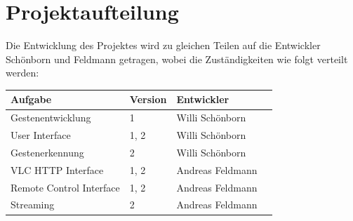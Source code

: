 \documentclass[a4paper,12pt]{article}
\begin{document}
\section*{Projektaufteilung}
Die Entwicklung des Projektes wird zu gleichen Teilen auf die Entwickler Schönborn und Feldmann getragen, wobei die Zuständigkeiten wie folgt verteilt werden:

\begin{table}[h!b!p!]
\begin{tabular*}{\textwidth}{ l l l l }
	\toprule
	\textbf{Aufgabe} & \textbf{Version} & \textbf{Entwickler} \\
	\midrule
	Gestenentwicklung & 1 & Willi Schönborn  \\ 
	User Interface & 1, 2 & Willi Schönborn \\
	Gestenerkennung & 2 & Willi Schönborn \\
	VLC HTTP Interface & 1, 2 & Andreas Feldmann \\
	Remote Control Interface & 1, 2 & Andreas Feldmann \\
	Streaming & 2 & Andreas Feldmann \\
	\bottomrule
\end{tabular*}
\end{table}

\newpage
\nocite{*}
\printbibliography

\listoffigures
\end{document}
